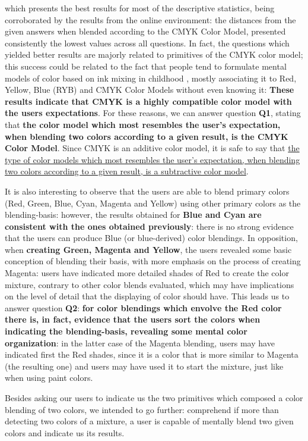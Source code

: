which presents the best results for most of the descriptive statistics, being corroborated by the results from the online environment: the distances from the given answers when blended according to the CMYK Color Model, presented consistently the lowest values across
all questions. In fact, the questions which yielded better results are majorly related to primitives of the CMYK color model; this success could be related to the fact that people tend to formulate mental models of color based on ink mixing in childhood
\cite{Gossett2004}, mostly associating it to Red, Yellow, Blue (RYB) and CMYK Color Models without even knowing it: \textbf{These results indicate that CMYK is a highly compatible color model with the users expectations}. For these reasons, we can answer question
\textbf{Q1}, stating that \textbf{the color model which most resembles the user's expectation, when blending two colors according to a given result, is the CMYK Color Model}. Since CMYK is an additive color model, it is safe to say that \ul{the type of color models which
most resembles the user's expectation, when blending two colors according to a given result, is a subtractive color model}. \par
%
It is also interesting to observe that the users are able to blend primary colors (Red, Green, Blue, Cyan, Magenta and Yellow) using other primary colors as the blending-basis: however, the results obtained for \textbf{Blue and Cyan are consistent with the ones
obtained previously}: there is no strong evidence that the users can produce Blue (or blue-derived) color blendings. In opposition, when \textbf{creating Green, Magenta and Yellow}, the users revealed some basic conception of blending their basis, with more emphasis
on the process of creating Magenta: users have indicated more detailed shades of Red to create the color mixture, contrary to other color blends evaluated, which may have implications on the level of detail that the displaying of color should have. This leads us to
answer question \textbf{Q2}: \textbf{for color blendings which envolve the Red color there is, in fact, evidence that the users sort the colors when indicating the blending-basis, revealing some mental color organization}: in the latter case of the Magenta blending, users may have indicated
first the Red shades, since it is a color that is more similar to Magenta (the resulting one) and users may have used it to start the mixture, just like when using paint colors. \par
%
Besides asking our users to indicate us the two primitives which composed a color blending of two colors, we intended to go further: comprehend if more than detecting two colors of a mixture, a user is capable of mentally blend two given colors and indicate us its results.
